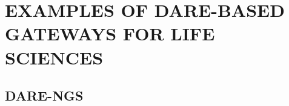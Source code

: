 \documentclass[]{svjour3}
\begin{document}

 \section{EXAMPLES OF DARE-BASED GATEWAYS FOR LIFE SCIENCES}


\subsection{DARE-NGS}
\end{document}
